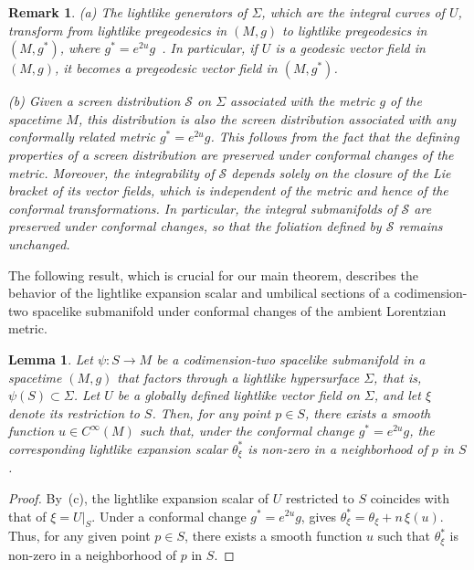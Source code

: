 \documentclass[11pt]{article}
\numberwithin{equation}{section}
\newtheorem{lemma}[theorem]{Lemma}
\newtheorem{remark}[theorem]{Remark}
\begin{document}
\begin{remark} \label{CTU} \normalfont
	(a) The lightlike generators of $\Sigma$, which are the integral curves of $U$, transform from lightlike pregeodesics in $(M, g)$ to lightlike pregeodesics in $(M, g^*)$, where $g^* = e^{2u}g$~\cite[Lem.~9.17]{beem}. In particular, if $U$ is a geodesic vector field in $(M, g)$, it becomes a pregeodesic vector field in $(M, g^*)$.
	
	(b) Given a screen distribution $\mathcal{S}$ on $\Sigma$ associated with the metric $g$ of the spacetime $M$, this distribution is also the screen distribution associated with any conformally related metric $g^* = e^{2u}g$. This follows from the fact that the defining properties of a screen distribution are preserved under conformal changes of the metric. Moreover, the integrability of $\mathcal{S}$ depends solely on the closure of the Lie bracket of its vector fields, which is independent of the metric and hence of the conformal transformations. In particular, the integral submanifolds of $\mathcal{S}$ are preserved under conformal changes, so that the foliation defined by $\mathcal{S}$ remains unchanged.
\end{remark}
	
	
The following result, which is crucial for our main theorem, describes the behavior of the lightlike expansion scalar and umbilical sections of a codimension-two spacelike submanifold under conformal changes of the ambient Lorentzian metric.

\begin{lemma}\label{lemma:conformal}
	Let $\psi\colon S \to M$ be a codimension-two spacelike submanifold in a spacetime $(M, g)$ that factors through a lightlike hypersurface $\Sigma$, that is, $\psi(S) \subset \Sigma$. Let $U$ be a globally defined lightlike vector field on $\Sigma$, and let $\xi$ denote its restriction to $S$. Then, for any point $p \in S$, there exists a smooth function $u \in C^\infty(M)$ such that, under the conformal change $g^* = e^{2u}g$, the corresponding lightlike expansion scalar $\theta_\xi^*$ is non-zero in a neighborhood of $p$ in $S$.
\end{lemma}

\begin{proof}
	By~(c), the lightlike expansion scalar of $U$ restricted to $S$ coincides with that of $\xi = U|_S$. Under a conformal change $g^* = e^{2u}g$,  gives $\theta_\xi^* = \theta_\xi + n\,\xi(u)$. Thus, for any given point $p \in S$, there exists a smooth function $u$ such that $\theta_\xi^*$ is non-zero in a neighborhood of $p$ in $S$.
\end{proof}
	
\end{document}
